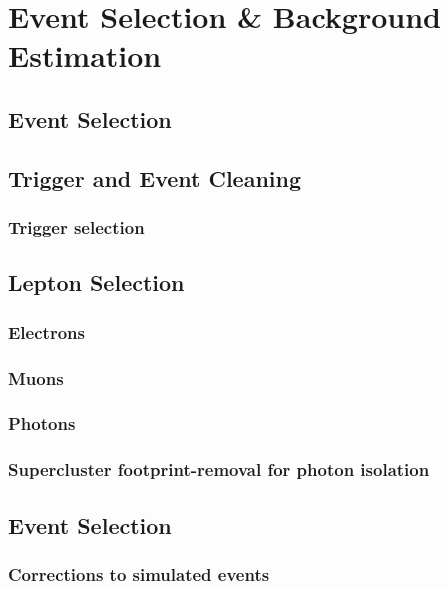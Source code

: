 \chapter{Event Selection \& Background Estimation} \label{chap-EventSelection}

\section{Event Selection}

\section{Trigger and Event Cleaning}

\subsection{Trigger selection}

\section{Lepton Selection}

\subsection{Electrons}

\subsection{Muons}

\subsection{Photons}

\subsection{Supercluster footprint-removal for photon isolation}

\section{Event Selection}

\subsection{Corrections to simulated events}

